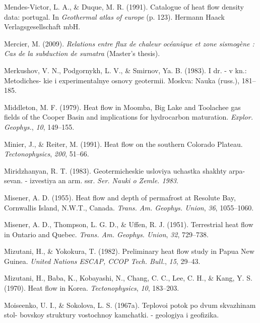 \begin{CSLReferences}{1}{1}
\leavevmode{}%
Mendes-Victor, L. A., \& Duque, M. R. (1991). Catalogue of heat flow density data: portugal. In \emph{Geothermal atlas of europe} (p. 123). Hermann Haack Verlagsgesellschaft mbH.

\leavevmode{}%
Mercier, M. (2009). \emph{Relations entre flux de chaleur océanique et zone sismogène : Cas de la subduction de sumatra} (Master's thesis).

\leavevmode{}%
Merkushov, V. N., Podgornykh, L. V., \& Smirnov, Ya. B. (1983). I dr. - v kn.: Metodiches- kie i experimentalnye osnovy geotermii. Moskva: Nauka (russ.), 181--185.

\leavevmode{}%
Middleton, M. F. (1979). Heat flow in {Moomba, Big Lake and Toolachee} gas fields of the {Cooper Basin} and implications for hydrocarbon maturation. \emph{Explor. Geophys.}, \emph{10}, 149--155.

\leavevmode{}%
Minier, J., \& Reiter, M. (1991). Heat flow on the southern {Colorado Plateau}. \emph{Tectonophysics}, \emph{200}, 51--66.

\leavevmode{}%
Miridzhanyan, R. T. (1983). Geotermicheskie usloviya uchastka shakhty arpa- sevan. - izvestiya an arm. ssr. \emph{Ser. Nauki o Zemle. 1983}.

\leavevmode{}%
Misener, A. D. (1955). Heat flow and depth of permafrost at {Resolute Bay, Cornwallis Island, N.W.T., Canada}. \emph{Trans. Am. Geophys. Union}, \emph{36}, 1055--1060.

\leavevmode{}%
Misener, A. D., Thompson, L. G. D., \& Uffen, R. J. (1951). Terrestrial heat flow in {Ontario and Quebec}. \emph{Trans. Am. Geophys. Union}, \emph{32}, 729--738.

\leavevmode{}%
Mizutani, H., \& Yokokura, T. (1982). Preliminary heat flow study in {Papua New Guinea}. \emph{United Nations ESCAP, CCOP Tech. Bull.}, \emph{15}, 29--43.

\leavevmode{}%
Mizutani, H., Baba, K., Kobayashi, N., Chang, C. C., Lee, C. H., \& Kang, Y. S. (1970). Heat flow in {Korea}. \emph{Tectonophysics}, \emph{10}, 183--203.

\leavevmode{}%
Moiseenko, U. I., \& Sokolova, L. S. (1967a). Teplovoi potok po dvum skvazhinam stol- bovskoy struktury vostochnoy kamchatki. - geologiya i geofizika.


\end{CSLReferences}
